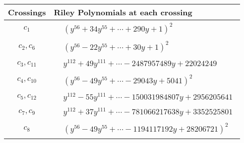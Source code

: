 \documentclass[1p]{elsarticle_modified}
\theoremstyle{definition}
\begin{document}
\begin{tabular}{m{50pt}|m{274pt}}
Crossings & \hspace{64pt}Riley Polynomials at each crossing \\
\hline $$\begin{aligned}c_{1}\end{aligned}$$&$\begin{aligned}
&(y^{56}+34 y^{55}+\cdots+290 y+1)^{2}
\end{aligned}$\\
\hline $$\begin{aligned}c_{2},c_{6}\end{aligned}$$&$\begin{aligned}
&(y^{56}-22 y^{55}+\cdots+30 y+1)^{2}
\end{aligned}$\\
\hline $$\begin{aligned}c_{3},c_{11}\end{aligned}$$&$\begin{aligned}
&y^{112}+49 y^{111}+\cdots-2487957489 y+22024249
\end{aligned}$\\
\hline $$\begin{aligned}c_{4},c_{10}\end{aligned}$$&$\begin{aligned}
&(y^{56}-49 y^{55}+\cdots-29043 y+5041)^{2}
\end{aligned}$\\
\hline $$\begin{aligned}c_{5},c_{12}\end{aligned}$$&$\begin{aligned}
&y^{112}-55 y^{111}+\cdots-150031984807 y+2956205641
\end{aligned}$\\
\hline $$\begin{aligned}c_{7},c_{9}\end{aligned}$$&$\begin{aligned}
&y^{112}+37 y^{111}+\cdots-781066217638 y+3352525801
\end{aligned}$\\
\hline $$\begin{aligned}c_{8}\end{aligned}$$&$\begin{aligned}
&(y^{56}-49 y^{55}+\cdots-1194117192 y+28206721)^{2}
\end{aligned}$\\
\hline
\end{tabular}\\~\\
\end{document}
